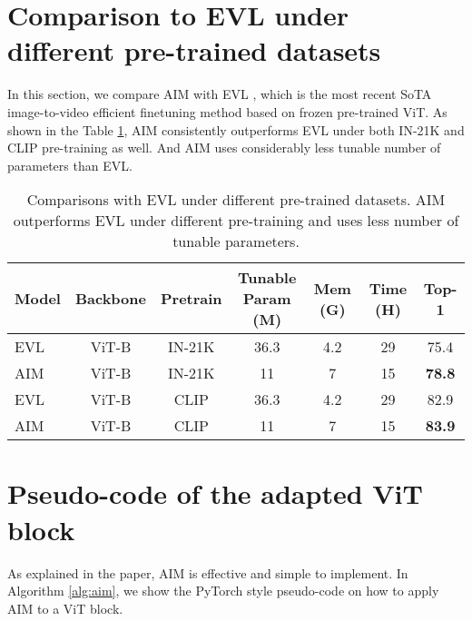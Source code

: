 \documentclass{article} \usepackage{iclr2023_conference,times}
\begin{document}
	
	\section{Comparison to EVL under different pre-trained datasets}
	In this section, we compare AIM with EVL \cite{frozenclip}, which is the most recent SoTA image-to-video efficient finetuning method based on frozen pre-trained ViT. As shown in the Table \ref{tab:compareevl}, AIM consistently outperforms EVL under both IN-21K and CLIP pre-training as well. And AIM uses considerably less tunable number of parameters than EVL.
	
	
	\begin{table}[t]
		\caption{Comparisons with EVL under different pre-trained datasets. AIM outperforms EVL under different pre-training and uses less number of tunable parameters.}
		\begin{center}
			\begin{tabular}{l|cc|cccc}
				\hline
				Model & Backbone & Pretrain & \makecell{Tunable \\ Param (M)} &  Mem (G) & Time (H) & Top-1  \\
				\hline
				EVL \cite{frozenclip} & ViT-B & IN-21K & 36.3 & 4.2 & 29 & 75.4 \\
				AIM & ViT-B & IN-21K & 11 & 7 & 15 & \textbf{78.8} \\
				\hline
				EVL \cite{frozenclip} & ViT-B & CLIP & 36.3 & 4.2 & 29 & 82.9 \\
				AIM & ViT-B & CLIP & 11 & 7 & 15 & \textbf{83.9} \\
				\hline
			\end{tabular}
		\end{center}
		\label{tab:compareevl}
	\end{table}
	
	\section{Pseudo-code of the adapted ViT block}
	As explained in the paper, AIM is effective and simple to implement. In Algorithm \ref{alg:aim}, we show the PyTorch style pseudo-code on how to apply AIM to a ViT block.
	
\end{document}
